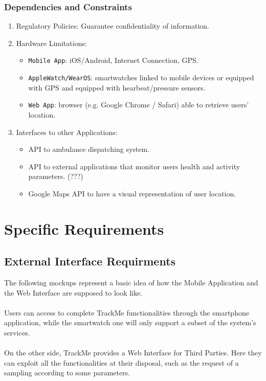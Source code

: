 \documentclass[12pt,a4paper]{article}
\begin{document}
	\subsubsection{Dependencies and Constraints}
	\begin{enumerate}
		\item Regulatory Policies:
		Guarantee confidentiality of information.
		\item Hardware Limitations: 
		\begin{itemize}
			\item \texttt{Mobile App}: iOS/Android, Internet Connection, GPS.
			\item \texttt{AppleWatch/WearOS}: smartwatches linked to mobile devices or equipped with GPS and equipped with hearbeat/pressure sensors.
			\item \texttt{Web App}: browser (e.g. Google Chrome / Safari) able to retrieve users' location.
		\end{itemize}
		\item Interfaces to other Applications: 
		\begin{itemize}
			\item API to ambulance dispatching system.
			\item API to external applications that monitor users health and activity parameters. (???)
			\item Google Maps API to have a visual representation of user location.
		\end{itemize}
	\end{enumerate}
	
	\newpage
	\section{Specific Requirements}
	\subsection{External Interface Requirments}
	The following mockups represent a basic idea of how the Mobile Application and the Web Interface are supposed to look like.
	\\ \\
	Users can access to complete TrackMe functionalities through the smartphone application, while the smartwatch one will only support a subset of the system's services.
	\\ \\
	On the other side, TrackMe provides a Web Interface for Third Parties. Here they can exploit all the functionalities at their disposal, such as the request of a sampling according to some parameters.
	
\end{document}
